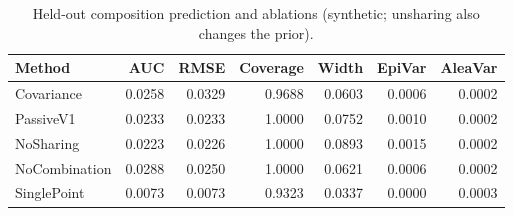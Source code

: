 \begin{table}[t]
\caption{Held-out composition prediction and ablations (synthetic; unsharing also changes the prior).}
\label{tab:experiment3}
\begin{tabular}{lrrrrrr}
\toprule
Method & AUC & RMSE & Coverage & Width & EpiVar & AleaVar \\
\midrule
Covariance & 0.0258 & 0.0329 & 0.9688 & 0.0603 & 0.0006 & 0.0002 \\
PassiveV1 & 0.0233 & 0.0233 & 1.0000 & 0.0752 & 0.0010 & 0.0002 \\
NoSharing & 0.0223 & 0.0226 & 1.0000 & 0.0893 & 0.0015 & 0.0002 \\
NoCombination & 0.0288 & 0.0250 & 1.0000 & 0.0621 & 0.0006 & 0.0002 \\
SinglePoint & 0.0073 & 0.0073 & 0.9323 & 0.0337 & 0.0000 & 0.0003 \\
\bottomrule
\end{tabular}
\end{table}
